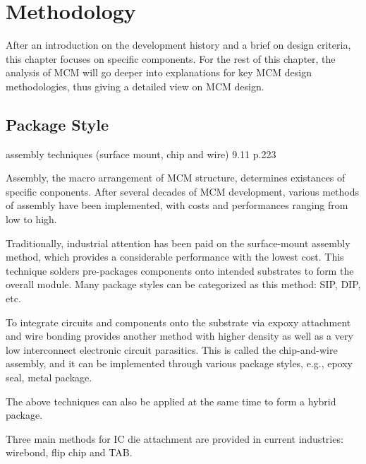 
\chapter{Methodology}
\begin{spacing}{1.5}
\setlength{\parskip}{0.3in}

After an introduction on the development history and a brief on design criteria, this chapter focuses on specific components. For the rest of this chapter, the analysis of MCM will go deeper into explanations for key MCM design methodologies, thus giving a detailed view on MCM design. 

\section{Package Style}

assembly techniques (surface mount, chip and wire) 9.11 p.223 

Assembly, the macro arrangement of MCM structure, determines existances of specific conponents. After several decades of MCM development, various methods of assembly have been implemented, with costs and performances ranging from low to high. 

Traditionally, industrial attention has been paid on the surface-mount assembly method, which provides a considerable performance with the lowest cost. This technique solders pre-packages components onto intended substrates to form the overall module. Many package styles can be categorized as this method: SIP, DIP, etc. 

To integrate circuits and components onto the substrate via expoxy attachment and wire bonding provides another method with higher density as well as a very low interconnect electronic circuit parasitics. This is called the chip-and-wire assembly, and it can be implemented through various package styles, e.g., epoxy seal, metal package. 

The above techniques can also be applied at the same time to form a hybrid package. \cite{licari1998hybrid}

Three main methods for IC die attachment are provided in current industries: wirebond, flip chip and TAB. \cite{bogatin1997roadmaps} 



\end{spacing}
